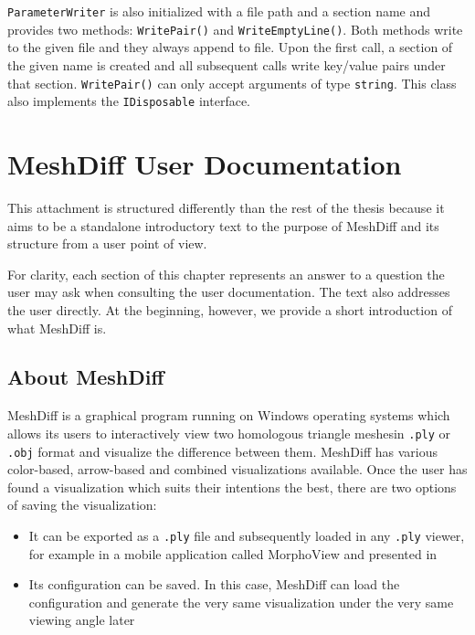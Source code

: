\verb+ParameterWriter+ is also initialized with a file path and a section name and provides two methods: \verb+WritePair()+ and \verb+WriteEmptyLine()+. Both methods write to the given file and they always append to file. Upon the first call, a section of the given name is created and all subsequent calls write key/value pairs under that section. \verb+WritePair()+ can only accept arguments of type \verb+string+. This class also implements the \verb+IDisposable+ interface.


\section{MeshDiff User Documentation}

This attachment is structured differently than the rest of the thesis because it aims to be a standalone introductory text to the purpose of MeshDiff and its structure from a user point of view.

For clarity, each section of this chapter represents an answer to a question the user may ask when consulting the user documentation. The text also addresses the user directly. At the beginning, however, we provide a short introduction of what MeshDiff is.

\subsection{About MeshDiff}

MeshDiff is a graphical program running on Windows operating systems which allows its users to interactively view two homologous triangle meshes\footnotemark in \verb+.ply+ or \verb+.obj+ format and visualize the difference between them. MeshDiff has various color-based, arrow-based and combined visualizations available. Once the user has found a visualization which suits their intentions the best, there are two options of saving the visualization:

\begin{itemize}
\item It can be exported as a \verb+.ply+ file and subsequently loaded in any \verb+.ply+ viewer, for example in a mobile application called MorphoView and  presented in \citet{Pikora}
\item Its configuration can be saved. In this case, MeshDiff can load the configuration and generate the very same visualization under the very same viewing angle later
\end{itemize}

